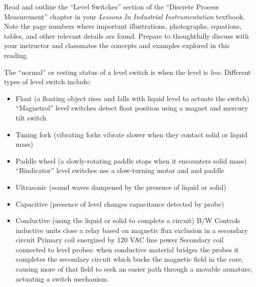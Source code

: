 

Read and outline the ``Level Switches'' section of the ``Discrete Process Measurement'' chapter in your {\it Lessons In Industrial Instrumentation} textbook.  Note the page numbers where important illustrations, photographs, equations, tables, and other relevant details are found.  Prepare to thoughtfully discuss with your instructor and classmates the concepts and examples explored in this reading.














The ``normal'' or resting status of a level switch is when the level is {\it low}.  Different types of level switch include:

\begin{itemize}
\item{} Float (a floating object rises and falls with liquid level to actuate the switch)
\itemitem{} ``Magnetrol'' level switches detect float position using a magnet and mercury tilt switch
\item{} Tuning fork (vibrating forks vibrate slower when they contact solid or liquid mass)
\item{} Paddle wheel (a slowly-rotating paddle stops when it encounters solid mass)
\itemitem{} ``Bindicator'' level switches use a slow-turning motor and and paddle
\item{} Ultrasonic (sound waves dampened by the presence of liquid or solid)
\item{} Capacitive (presence of level changes capacitance detected by probe)
\item{} Conductive (using the liquid or solid to complete a circuit)
\itemitem{} B/W Controls inductive units close a relay based on magnetic flux exclusion in a secondary circuit
\itemitem{} Primary coil energized by 120 VAC line power
\itemitem{} Secondary coil connected to level probes: when conductive material bridges the probes it completes the secondary circuit which bucks the magnetic field in the core, causing more of that field to seek an easier path through a movable armature, actuating a switch mechanism.
\end{itemize}





